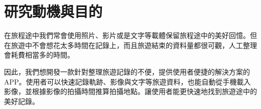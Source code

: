 \section{研究動機與目的}

在旅程途中我們常會使用照片、影片或是文字等載體保留旅程途中的美好回憶。但在旅遊中不會想花太多時間在記錄上，而且旅遊結束的資料量都很可觀，人工整理會耗費相當多的時間。

因此，我們想開發一款針對整理旅遊記錄的不便，提供使用者便捷的解決方案的APP。使用者可以快速記錄軌跡、影像與文字等旅遊資料，也能自動從手機載入影像，並根據影像的拍攝時間推算拍攝地點。讓使用者能更快速地找到旅遊途中的美好記錄。








